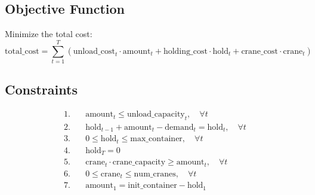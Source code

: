 \documentclass{article}
\begin{document}
\subsection*{Objective Function}
Minimize the total cost:
\[
\text{total\_cost} = \sum_{t=1}^{T} \left( \text{unload\_cost}_{t} \cdot \text{amount}_{t} + \text{holding\_cost} \cdot \text{hold}_{t} + \text{crane\_cost} \cdot \text{crane}_{t} \right)
\]

\subsection*{Constraints}
\begin{align*}
1. & \quad \text{amount}_{t} \leq \text{unload\_capacity}_{t}, \quad \forall t \\
2. & \quad \text{hold}_{t-1} + \text{amount}_{t} - \text{demand}_{t} = \text{hold}_{t}, \quad \forall t \\
3. & \quad 0 \leq \text{hold}_{t} \leq \text{max\_container}, \quad \forall t \\
4. & \quad \text{hold}_{T} = 0 \\
5. & \quad \text{crane}_{t} \cdot \text{crane\_capacity} \geq \text{amount}_{t}, \quad \forall t \\
6. & \quad 0 \leq \text{crane}_{t} \leq \text{num\_cranes}, \quad \forall t \\
7. & \quad \text{amount}_{1} = \text{init\_container} - \text{hold}_{1} \\
\end{align*}
\end{document}
